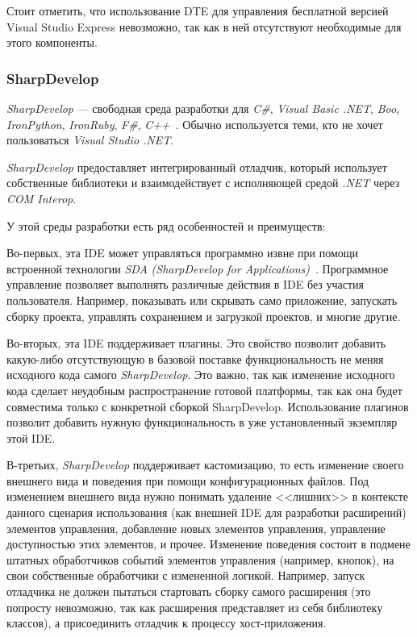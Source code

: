 Стоит отметить, что использование DTE для управления бесплатной версией Visual Studio Express невозможно, так как в ней отсутствуют необходимые для этого компоненты.

\subsubsection{SharpDevelop}

{\it SharpDevelop} --- свободная среда разработки для {\it C\#}, {\it Visual Basic .NET}, {\it Boo}, {\it IronPython}, {\it IronRuby}, {\it F\#}, {\it C++}~\cite{sharpdevelop}. Обычно используется теми, кто не хочет пользоваться {\it Visual Studio .NET}.

{\it SharpDevelop} предоставляет интегрированный отладчик, который использует собственные библиотеки и взаимодействует с исполняющей средой {\it .NET} через {\it COM Interop}.

У этой среды разработки есть ряд особенностей и преимуществ:

Во-первых, эта IDE может управляться программно извне при помощи встроенной технологии {\it SDA} {\it (SharpDevelop for Applications)}~\cite{announcing-sda-article}. Программное управление позволяет выполнять различные действия в IDE без участия пользователя. Например, показывать или скрывать само приложение, запускать сборку проекта, управлять сохранением и загрузкой проектов, и многие другие. 

Во-вторых, эта IDE поддерживает плагины. Это свойство позволит добавить какую-либо отсутствующую в базовой поставке функциональность не меняя исходного кода самого {\it SharpDevelop}. Это важно, так как изменение исходного кода сделает неудобным распространение готовой платформы, так как она будет совместима только с конкретной сборкой SharpDevelop. Использование плагинов позволит добавить нужную функциональность в уже установленный экземпляр этой IDE.

В-третьих, {\it SharpDevelop} поддерживает кастомизацию, то есть изменение своего внешнего вида и поведения при помощи конфигурационных файлов. Под изменением внешнего вида нужно понимать удаление <<лишних>> в контексте данного сценария использования (как внешней IDE для разработки расширений) элементов управления, добавление новых элементов управления, управление доступностью этих элементов, и прочее. Изменение поведения состоит в подмене штатных обработчиков событий элементов управления (например, кнопок), на свои собственные обработчики с измененной логикой. Например, запуск отладчика не должен пытаться стартовать сборку самого расширения (это попросту невозможно, так как расширения представляет из себя библиотеку классов), а присоединить отладчик к процессу хост-приложения.

